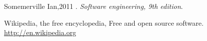 \documentclass[a4paper,12pt]{report}
\begin{document}
\maketitle{}

\newpage
\tableofcontents{}

\newpage
\listoffigures{}


\newpage


\newpage

\newpage
%
\newpage
%
\newpage
%
\newpage
%
\newpage

\newpage
%
\newpage
%
\newpage
%
\newpage
%


\begin{thebibliography}{99}

 Somemerville Ian,2011 .
  \textit{Software engineering, 9th edition}.

Wikipedia, the free encyclopedia, Free and open source software.
\url{http://en.wikipedia.org}

\end{thebibliography}
\end{document}
